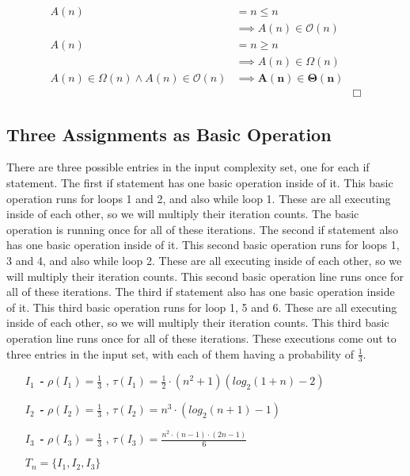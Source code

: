 \documentclass[10pt]{article}
\begin{document}
\begin{align*}
A(n) &= n \le n &\\
 &\implies A(n) \in \mathcal{O}(n) &\\
A(n) &= n \ge n &\\
 &\implies A(n) \in \Omega(n) &\\
 A(n) \in \Omega(n) \land A(n) \in \mathcal{O}(n) &\implies \mathbf{A(n) \boldsymbol{\in} \Theta(n)} &\\
 & &\Box
\end{align*}


\subsection{Three Assignments as Basic Operation}

\indent \indent There are three possible entries in the input complexity set, one for each if statement. The first if statement has one basic operation inside of it. This basic operation runs for loops 1 and 2, and also while loop 1. These are all executing inside of each other, so we will multiply their iteration counts. The basic operation is running once for all of these iterations. The second if statement also has one basic operation inside of it. This second basic operation runs for loops 1, 3 and 4, and also while loop 2. These are all executing inside of each other, so we will multiply their iteration counts. This second basic operation line runs once for all of these iterations. The third if statement also has one basic operation inside of it. This third basic operation runs for loop 1, 5 and 6. These are all executing inside of each other, so we will multiply their iteration counts. This third basic operation line runs once for all of these iterations. These executions come out to three entries in the input set, with each of them having a probability of $\frac{1}{3}$. 

\begin{enumerate}[leftmargin=2.6cm]
    \item[\textit{\textbf{$I_{1}$ - }}] $\rho (\mathit{I_{1}}) = \frac{1}{3}$ ,  $\tau (\mathit{I_{1}})= \frac{1}{2} \cdot (n^2 + 1) (log_{2}(1 + n) - 2)$
    \item[\textit{\textbf{$I_{2}$ - }}] $\rho (\mathit{I_{2}}) = \frac{1}{3}$ ,  $\tau (\mathit{I_{2}}) = n^3 \cdot (log_2(n+1) - 1)$
    \item[\textit{\textbf{$I_{3}$ - }}] $\rho (\mathit{I_{3}}) = \frac{1}{3}$ ,  $\tau (\mathit{I_{3}}) = \frac{ n^2\cdot (n-1) \cdot (2n-1) } {6}$
    \item[] $T_{n} = \{I_{1}, I_{2}, I_{3}\}$
\end{enumerate}
\end{document}
